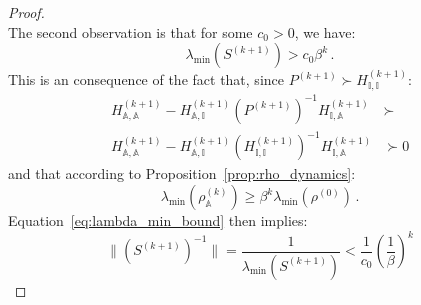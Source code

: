 \documentclass[10pt,a4paper]{amsart}
\begin{document}
\begin{proof}
\\
The second observation is that for some $c_0 > 0$, we have:
\begin{equation}
\label{eq:lambda_min_bound}
    \lambda_{\min}\left(S^{(k+1)}\right) > c_0 \beta^{k} \,.
\end{equation}
This is an consequence of the fact that, since $P^{(k+1)} \succ H_{\mathbb{I},\mathbb{I}}^{(k+1)}$:
\begin{equation}
\begin{aligned}
    H_{\mathbb{A},\mathbb{A}}^{(k+1)} - H^{(k+1)}_{\mathbb{A}, \mathbb{I}} (P^{(k+1)})^{-1} H_{\mathbb{I},\mathbb{A}}^{(k+1)} &\succ \\
    H_{\mathbb{A},\mathbb{A}}^{(k+1)} - H^{(k+1)}_{\mathbb{A}, \mathbb{I}} (H_{\mathbb{I}, \mathbb{I}}^{(k+1)})^{-1} H_{\mathbb{I},\mathbb{A}}^{(k+1)} &\succ 0
\end{aligned}
\end{equation}
and that according to Proposition~\ref{prop:rho_dynamics}:
\begin{equation}
    \lambda_{\min}\left(\rho_\mathbb{A}^{(k)}\right) \ge \beta^k \lambda_{\min}\left(\rho^{(0)}\right) \,.
\end{equation}
Equation~\eqref{eq:lambda_min_bound} then implies:
\begin{equation}
    \|\left(S^{(k+1)}\right)^{-1}\| = \frac{1}{\lambda_{\min}\left(S^{(k+1)}\right)} < \frac{1}{c_0} \left(\frac{1}{\beta}\right)^{k}
\end{equation}


\end{proof}
\end{document}

